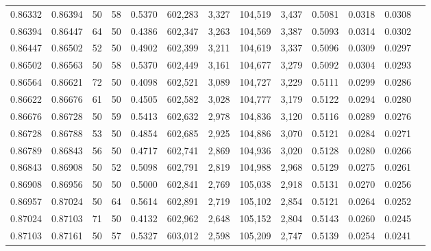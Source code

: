 \begin{tabular}{rrrrrrrrrrrrr}
0.86332 & 0.86394 &    50 &  58 &                                     0.5370 & 602,283 &   3,327 & 104,519 &   3,437 & 0.5081 & 0.0318 & 0.0308 \\
0.86394 & 0.86447 &    64 &  50 &                                     0.4386 & 602,347 &   3,263 & 104,569 &   3,387 & 0.5093 & 0.0314 & 0.0302 \\
0.86447 & 0.86502 &    52 &  50 &                                     0.4902 & 602,399 &   3,211 & 104,619 &   3,337 & 0.5096 & 0.0309 & 0.0297 \\
0.86502 & 0.86563 &    50 &  58 &                                     0.5370 & 602,449 &   3,161 & 104,677 &   3,279 & 0.5092 & 0.0304 & 0.0293 \\
0.86564 & 0.86621 &    72 &  50 &                                     0.4098 & 602,521 &   3,089 & 104,727 &   3,229 & 0.5111 & 0.0299 & 0.0286 \\
0.86622 & 0.86676 &    61 &  50 &                                     0.4505 & 602,582 &   3,028 & 104,777 &   3,179 & 0.5122 & 0.0294 & 0.0280 \\
0.86676 & 0.86728 &    50 &  59 &                                     0.5413 & 602,632 &   2,978 & 104,836 &   3,120 & 0.5116 & 0.0289 & 0.0276 \\
0.86728 & 0.86788 &    53 &  50 &                                     0.4854 & 602,685 &   2,925 & 104,886 &   3,070 & 0.5121 & 0.0284 & 0.0271 \\
0.86789 & 0.86843 &    56 &  50 &                                     0.4717 & 602,741 &   2,869 & 104,936 &   3,020 & 0.5128 & 0.0280 & 0.0266 \\
0.86843 & 0.86908 &    50 &  52 &                                     0.5098 & 602,791 &   2,819 & 104,988 &   2,968 & 0.5129 & 0.0275 & 0.0261 \\
0.86908 & 0.86956 &    50 &  50 &                                     0.5000 & 602,841 &   2,769 & 105,038 &   2,918 & 0.5131 & 0.0270 & 0.0256 \\
0.86957 & 0.87024 &    50 &  64 &                                     0.5614 & 602,891 &   2,719 & 105,102 &   2,854 & 0.5121 & 0.0264 & 0.0252 \\
0.87024 & 0.87103 &    71 &  50 &                                     0.4132 & 602,962 &   2,648 & 105,152 &   2,804 & 0.5143 & 0.0260 & 0.0245 \\
0.87103 & 0.87161 &    50 &  57 &                                     0.5327 & 603,012 &   2,598 & 105,209 &   2,747 & 0.5139 & 0.0254 & 0.0241 \\

\end{tabular}
